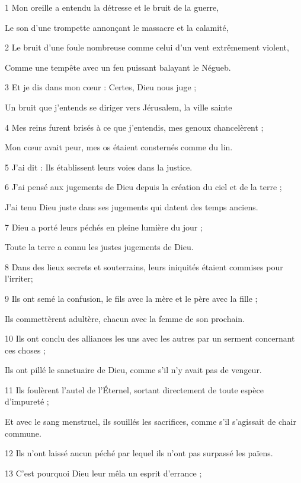 \par 1 Mon oreille a entendu la détresse et le bruit de la guerre,
\par     Le son d'une trompette annonçant le massacre et la calamité,
\par 2 Le bruit d'une foule nombreuse comme celui d'un vent extrêmement violent,
\par     Comme une tempête avec un feu puissant balayant le Négueb.
\par 3 Et je dis dans mon cœur : Certes, Dieu nous juge ;
\par     Un bruit que j'entends se diriger vers Jérusalem, la ville sainte
\par 4 Mes reins furent brisés à ce que j'entendis, mes genoux chancelèrent ;
\par     Mon cœur avait peur, mes os étaient consternés comme du lin.
\par 5 J'ai dit : Ils établissent leurs voies dans la justice.
\par   
\par 6 J'ai pensé aux jugements de Dieu depuis la création du ciel et de la terre ;
\par     J'ai tenu Dieu juste dans ses jugements qui datent des temps anciens.
\par 7 Dieu a porté leurs péchés en pleine lumière du jour ;
\par     Toute la terre a connu les justes jugements de Dieu.
\par 8 Dans des lieux secrets et souterrains, leurs iniquités étaient commises pour l'irriter;
\par 9 Ils ont semé la confusion, le fils avec la mère et le père avec la fille ;
\par     Ils commettèrent adultère, chacun avec la femme de son prochain.
\par 10 Ils ont conclu des alliances les uns avec les autres par un serment concernant ces choses ;
\par     Ils ont pillé le sanctuaire de Dieu, comme s'il n'y avait pas de vengeur.
\par 11 Ils foulèrent l'autel de l'Éternel, sortant directement de toute espèce d'impureté ;
\par     Et avec le sang menstruel, ils souillés les sacrifices, comme s'il s'agissait de chair commune.
\par 12 Ils n'ont laissé aucun péché par lequel ils n'ont pas surpassé les païens.
\par   
\par 13 C'est pourquoi Dieu leur mêla un esprit d'errance ;
